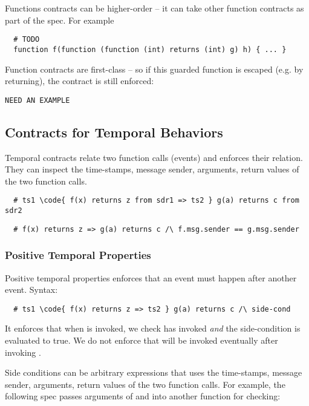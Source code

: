 Functions contracts can be higher-order --
it can take other function contracts
as part of the spec. For example
\begin{lstlisting}
  # TODO
  function f(function (function (int) returns (int) g) h) { ... }
\end{lstlisting}

Function contracts are first-class -- so if this guarded function is escaped
(e.g. by returning), the contract is still enforced:
\begin{lstlisting}
NEED AN EXAMPLE
\end{lstlisting}
\fi

\subsection{Contracts for Temporal Behaviors}

Temporal contracts relate two function calls (events) and enforces their
relation.
They can inspect the time-stamps, message sender, arguments, return values
of the two function calls.

\begin{lstlisting}
  # ts1 \code{ f(x) returns z from sdr1 => ts2 } g(a) returns c from sdr2
\end{lstlisting}
\begin{lstlisting}
  # f(x) returns z => g(a) returns c /\ f.msg.sender == g.msg.sender
\end{lstlisting}

\subsubsection{Positive Temporal Properties}

Positive temporal properties enforces that an event must happen
after another event. Syntax:
\begin{lstlisting}
  # ts1 \code{ f(x) returns z => ts2 } g(a) returns c /\ side-cond
\end{lstlisting}
It enforces that when  is invoked, we check  has invoked \emph{and}
the side-condition is evaluated to true.
We do not enforce that  will be invoked eventually after invoking .

Side conditions can be arbitrary expressions that uses the time-stamps, message
sender, arguments, return values of the two function calls.
For example, the following spec passes arguments of  and  into
another function for checking:


